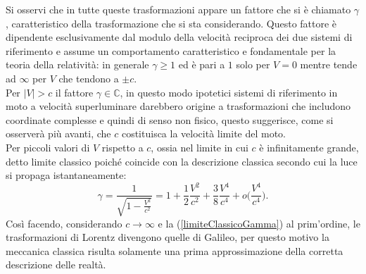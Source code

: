 Si osservi che in tutte queste trasformazioni appare un fattore che si è chiamato $\gamma$, caratteristico della trasformazione che si sta considerando. Questo fattore è dipendente esclusivamente dal modulo della velocità reciproca dei due sistemi di riferimento e assume un comportamento caratteristico e fondamentale per la teoria della relatività: in generale $\gamma\geq 1$ ed è pari a $1$ solo per $V=0$ mentre tende ad $\infty$ per $V$ che tendono a $\pm c$.\\
Per $|V|>c$ il fattore $\gamma\in\mathbb{C}$, in questo modo ipotetici sistemi di riferimento in moto a velocità superluminare darebbero origine a trasformazioni che includono coordinate complesse e quindi di senso non fisico, questo suggerisce, come si osserverà più avanti, che $c$ costituisca la velocità limite del moto.\\
Per piccoli valori di $V$ rispetto a $c$, ossia nel limite in cui $c$ è infinitamente grande, detto limite classico poiché coincide con la descrizione classica secondo cui la luce si propaga istantaneamente:
\begin{equation}
    \gamma=\frac{1}{\sqrt{1-\frac{V^2}{c^2}}}=1+\frac12\frac{V^2}{c^2}+\frac38\frac{V^4}{c^4}+o\bigg(\frac{V^4}{c^4}\bigg).
    \label{limiteClassicoGamma}
\end{equation}
Così facendo, considerando $c\rightarrow\infty$ e la (\ref{limiteClassicoGamma}) al prim'ordine, le trasformazioni di Lorentz divengono quelle di Galileo, per questo motivo la meccanica classica risulta solamente una prima approssimazione della corretta descrizione delle realtà.

